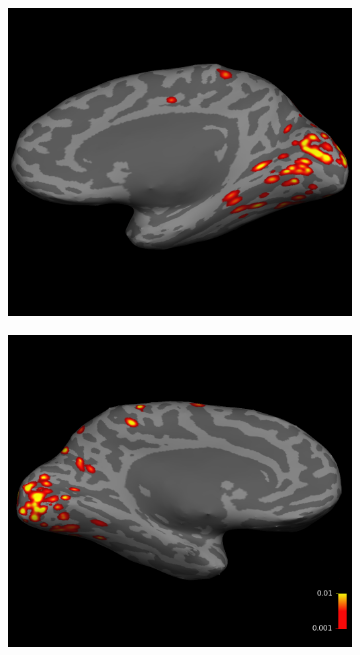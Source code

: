 \documentclass[5p,authoryear]{elsarticle}
\begin{document}
\begin{figure}[p]
\begin{subfigure}{0.3\textwidth}
\caption{}
\label{fig:s1-lh-medial-sensitivity}
\end{subfigure}
\begin{subfigure}{0.3\textwidth}
\centering
\includegraphics[width=\textwidth]{figures/s2-rh-medial-sensitivity}
\caption{}
\label{fig:s2-rh-medial-sensitivity}
\end{subfigure}
\begin{subfigure}{0.3\textwidth}
\centering
\includegraphics[width=\textwidth]{figures/s3-lh-medial-sensitivity}

\end{subfigure}
\end{figure}
\end{document}
